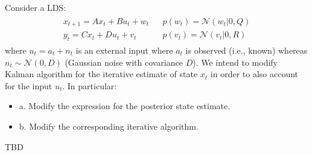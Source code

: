 \Exercise[number={7}]
Consider a LDS:
\begin{align*}
    \begin{matrix}
        x_{t+1}=Ax_t+Bu_t+w_t && p(w_t)=\mathcal{N}(w_t|0,Q)\\
        y_t=Cx_t+Du_t+v_t && p(v_t)=\mathcal{N}(v_t|0,R)
    \end{matrix}
\end{align*}
where \(u_t=a_t+n_t\) is an external input where \(a_t\) is observed
(i.e., known) whereas \(n_t\sim\mathcal{N}(0,D)\) (Gaussian noise with
covariance \(D\)). We intend to modify Kalman algorithm for the iterative
estimate of state \(x_t\) in order to also account for the input \(u_t\).
In particular:
\begin{itemize}
    \item\quad a. Modify the expression for the posterior state estimate.
    \item\quad b. Modify the corresponding iterative algorithm.
\end{itemize}

\Answer[number={7}]
TBD